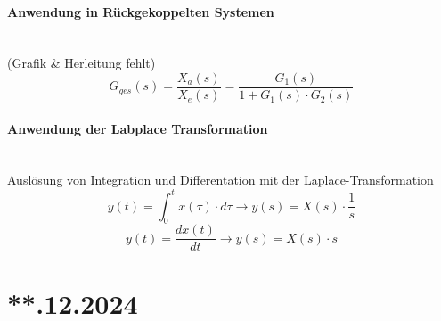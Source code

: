 \documentclass{article}
\begin{document}
\paragraph{Anwendung in Rückgekoppelten Systemen} \mbox{} \\
(Grafik \& Herleitung fehlt)
\[ G_{ges}(s) = \frac{X_a(s)}{X_e(s)} = \frac{G_1(s)}{1+ G_1(s) \cdot G_2(s)} \]

\paragraph{Anwendung der Labplace Transformation} \mbox{} \\
Auslösung von Integration und Differentation mit der Laplace-Transformation \\
\[ y(t) = \int_{0}^{t} x(\tau) \cdot d\tau \to y(s) = X(s) \cdot \frac{1}{s} \]
\[ y(t) = \frac{dx(t)}{dt} \to y(s) = X(s) \cdot s \]


\newpage
\section*{**.12.2024}
\end{document}
